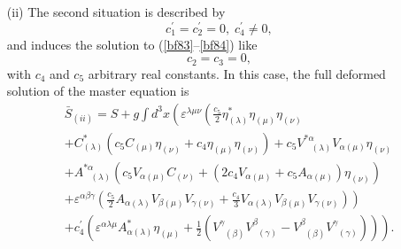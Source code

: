 \documentclass[a4paper,11pt]{article}
\begin{document}
\begin{enumerate}
\item[(ii)]  The second situation is described by
\begin{equation}
c_{1}^{\prime }=c_{2}^{\prime }=0,\;c_{4}^{\prime }\neq 0,  \label{bf89}
\end{equation}
and induces the solution to (\ref{bf83}--\ref{bf84}) like
\begin{equation}
c_{2}=c_{3}=0,  \label{bf90}
\end{equation}
with $c_{4}$ and $c_{5}$ arbitrary real constants. In this case, the full
deformed solution of the master equation is
\begin{eqnarray}
&&\bar{S}_{(ii)}=S+g\int d^{3}x\left( \varepsilon ^{\lambda \mu \nu }\left(
\frac{c_{5}}{2}\eta _{(\lambda )}^{*}\eta _{(\mu )}\eta _{(\nu )}\right.
\right.   \nonumber \\
&&+C_{(\lambda )}^{*}\left( c_{5}C_{(\mu )}\eta _{(\nu )}+c_{4}\eta _{(\mu
)}\eta _{(\nu )}\right) +c_{5}V_{\;\;\;(\lambda )}^{*\alpha }V_{\alpha (\mu
)}\eta _{(\nu )}  \nonumber \\
&&+A_{\;\;\;(\lambda )}^{*\alpha }\left( c_{5}V_{\alpha (\mu )}C_{(\nu
)}+\left( 2c_{4}V_{\alpha (\mu )}+c_{5}A_{\alpha (\mu )}\right) \eta _{(\nu
)}\right)   \nonumber \\
&&\left. +\varepsilon ^{\alpha \beta \gamma }\left( \frac{c_{5}}{2}A_{\alpha
(\lambda )}V_{\beta (\mu )}V_{\gamma (\nu )}+\frac{c_{4}}{3}V_{\alpha
(\lambda )}V_{\beta (\mu )}V_{\gamma (\nu )}\right) \right)   \nonumber \\
&&\left. +c_{4}^{\prime }\left( \varepsilon ^{\alpha \lambda \mu }A_{\alpha
(\lambda )}^{*}\eta _{(\mu )}+\frac{1}{2}\left( V_{\;\;(\beta )}^{\gamma
}V_{\;\;(\gamma )}^{\beta }-V_{\;\;(\beta )}^{\beta }V_{\;\;(\gamma
)}^{\gamma }\right) \right) \right) .  \label{bf91}
\end{eqnarray}


\end{enumerate}
\end{document}
